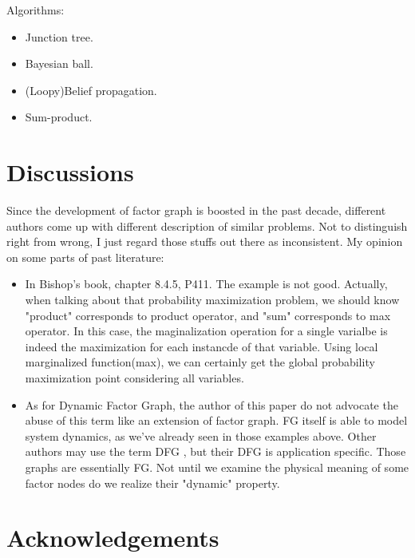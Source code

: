 \documentclass[11pt,a4paper]{article}
\begin{document}
Algorithms:
\begin{itemize}
	\item Junction tree. 
	\item Bayesian ball. 
	\item (Loopy)Belief propagation. 
	\item Sum-product. 
\end{itemize}

\section{Discussions}

Since the development of factor graph is boosted in the past decade, 
different authors come up with different description of similar problems. 
Not to distinguish right from wrong, I just regard those stuffs out there
as inconsistent. My opinion on some parts of past literature:
\begin{itemize}
	\item In Bishop's book\cite{bishop2006pattern}, chapter 8.4.5, P411. 
	The example is not good. Actually, when talking about that probability 
	maximization problem, we should know "product" corresponds to product operator, 
	and "sum" corresponds to max operator. In this case, the maginalization 
	operation for a single varialbe is indeed the maximization for each 
	instancde of that variable. Using local marginalized function(max), we 
	can certainly get the global probability maximization point considering
	all variables. 
	\item As for Dynamic Factor Graph, the author of this paper do not advocate 
	the abuse of this term like an extension of factor graph. FG itself is able 
	to model system dynamics, as we've already seen in those examples above. 
	Other authors may use the term DFG
\cite{wang2011-dynamic}
\cite{mirowski2009dynamic}
	, but their DFG is application specific. 
	Those graphs are essentially FG. Not until we examine the physical meaning of 
	some factor nodes do we realize their "dynamic" property. 
\end{itemize}

\section*{Acknowledgements}


\end{document}
